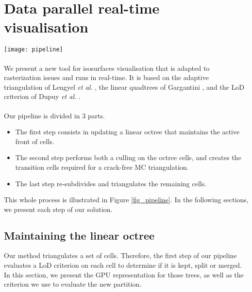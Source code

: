 \section{Data parallel real-time visualisation}

\begin{figure*} [t!]
  \centering
  \texttt{[image: pipeline]}
  \caption{ This figure summarizes our GPU pipeline. Data buffers are represented in green and computations in red. Each computation retrieves data from a buffer and fills a new one. }
  \label{fig_pipeline} 
\end{figure*}

\paragraph{}
We present a new tool for isosurfaces visualisation that is adapted to rasterization issues and runs in real-time.
It is based on the adaptive triangulation of Lengyel \textit{et al}. \cite{lengyel2010voxel}, the linear quadtrees  of Gargantini \cite{gargantini1982effective}, and the LoD criterion of Dupuy \textit{et al.} \cite{dupuy2014quadtrees}.


\paragraph{}
Our pipeline is divided in 3 parts.
\begin{itemize}
\item The first step consists in updating a linear octree that maintains the active front of cells.
\item The second step performs both a culling on the octree cells, and creates the transition cells required for a crack-free MC triangulation.
\item The last step re-subdivides and triangulates the remaining cells.
\end{itemize}
This whole process is illustrated in Figure \ref{fig_pipeline}.
In the following sections, we present each step of our solution.

\subsection{Maintaining the linear octree}

Our method triangulates a set of cells.  Therefore, the first step of
our pipeline evaluates a LoD criterion on each cell to determine if it
is kept, split or merged.  In this section, we present the GPU
representation for those trees, as well as the criterion we use to
evaluate the new partition.

